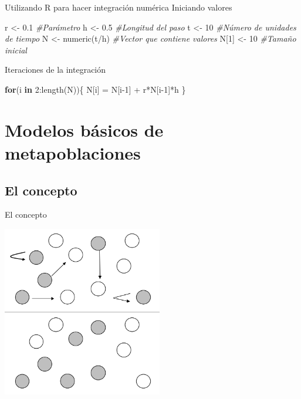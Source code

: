 \documentclass[
  11pt,
  ignorenonframetext,
]{beamer}
\newenvironment{Shaded}{}{}
\newcommand{\CommentTok}[1]{\textcolor[rgb]{0.38,0.63,0.69}{\textit{#1}}}
\newcommand{\ControlFlowTok}[1]{\textcolor[rgb]{0.00,0.44,0.13}{\textbf{#1}}}
\newcommand{\DecValTok}[1]{\textcolor[rgb]{0.25,0.63,0.44}{#1}}
\newcommand{\FloatTok}[1]{\textcolor[rgb]{0.25,0.63,0.44}{#1}}
\newcommand{\FunctionTok}[1]{\textcolor[rgb]{0.02,0.16,0.49}{#1}}
\newcommand{\NormalTok}[1]{#1}
\newcommand{\OtherTok}[1]{\textcolor[rgb]{0.00,0.44,0.13}{#1}}
\newcommand{\SpecialCharTok}[1]{\textcolor[rgb]{0.25,0.44,0.63}{#1}}
\begin{document}
\begin{frame}[fragile]{Utilizando R para hacer integración numérica}
Iniciando valores

\begin{Shaded}
\begin{Highlighting}[]
\NormalTok{r }\OtherTok{\textless{}{-}} \FloatTok{0.1} \CommentTok{\#Parámetro}
\NormalTok{h }\OtherTok{\textless{}{-}} \FloatTok{0.5} \CommentTok{\#Longitud del paso}
\NormalTok{t }\OtherTok{\textless{}{-}} \DecValTok{10} \CommentTok{\#Número de unidades de tiempo}
\NormalTok{N }\OtherTok{\textless{}{-}} \FunctionTok{numeric}\NormalTok{(t}\SpecialCharTok{/}\NormalTok{h) }\CommentTok{\#Vector que contiene valores}
\NormalTok{N[}\DecValTok{1}\NormalTok{] }\OtherTok{\textless{}{-}} \DecValTok{10} \CommentTok{\#Tamaño inicial}
\end{Highlighting}
\end{Shaded}

Iteraciones de la integración

\begin{Shaded}
\begin{Highlighting}[]
\ControlFlowTok{for}\NormalTok{(i }\ControlFlowTok{in} \DecValTok{2}\SpecialCharTok{:}\FunctionTok{length}\NormalTok{(N))\{}
\NormalTok{      N[i] }\OtherTok{=}\NormalTok{ N[i}\DecValTok{{-}1}\NormalTok{] }\SpecialCharTok{+}\NormalTok{ r}\SpecialCharTok{*}\NormalTok{N[i}\DecValTok{{-}1}\NormalTok{]}\SpecialCharTok{*}\NormalTok{h}
\NormalTok{  \}}
\end{Highlighting}
\end{Shaded}
\end{frame}

\section{Modelos básicos de
metapoblaciones}\label{modelos-buxe1sicos-de-metapoblaciones}

\subsection{El concepto}\label{el-concepto}

\begin{frame}{El concepto}
\begin{center}\includegraphics[width=2.75in]{Metapoblaciones/MEtap-May} \end{center}
\end{frame}
\end{document}
